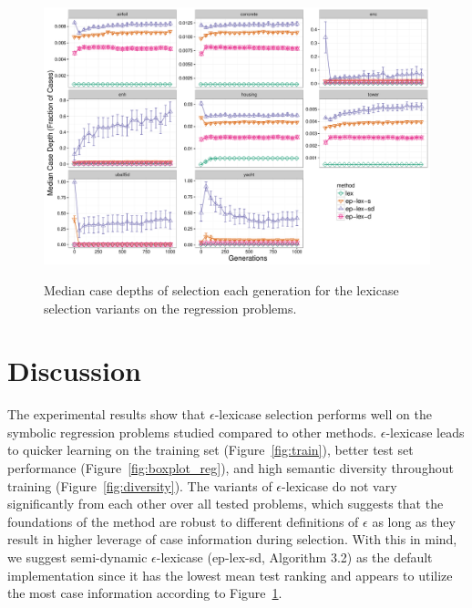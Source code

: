\documentclass[twoside]{article}
\begin{document}
\begin{figure}
\centering
  \includegraphics[width=\textwidth]{figs/median_case_depth.pdf}\\
 \caption{Median case depths of selection each generation for the lexicase selection variants on the regression problems.}\label{fig:case_depth}
\end{figure}

\label{tbl:tables===}





\section{Discussion}\label{s:discuss}
The experimental results show that $\epsilon$-lexicase selection performs well on the symbolic regression problems studied compared to other methods. $\epsilon$-lexicase leads to quicker learning on the training set (Figure~\ref{fig:train}), better test set performance (Figure~\ref{fig:boxplot_reg}), and high semantic diversity throughout training (Figure~\ref{fig:diversity}). The variants of $\epsilon$-lexicase do not vary significantly from each other over all tested problems, which suggests that the foundations of the method are robust to different definitions of $\epsilon$ as long as they result in higher leverage of case information during selection. With this in mind, we suggest semi-dynamic $\epsilon$-lexicase (ep-lex-sd, Algorithm 3.2) as the default implementation since it has the lowest mean test ranking and appears to utilize the most case information according to Figure~\ref{fig:case_depth}. 
 
\end{document}

